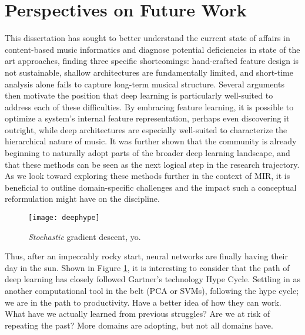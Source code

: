 \section{Perspectives on Future Work}
\label{sec:future}




This dissertation has sought to better understand the current state of affairs in content-based music informatics and diagnose potential deficiencies in state of the art approaches, finding three specific shortcomings: hand-crafted feature design is not sustainable, shallow architectures are fundamentally limited, and short-time analysis alone fails to capture long-term musical structure.
Several arguments then motivate the position that deep learning is particularly well-suited to address each of these difficulties.
By embracing feature learning, it is possible to optimize a system's internal feature representation, perhaps even discovering it outright, while deep architectures are especially well-suited to characterize the hierarchical nature of music.
It was further shown that the community is already beginning to naturally adopt parts of the broader deep learning landscape, and that these methods can be seen as the next logical step in the research trajectory.
As we look toward exploring these methods further in the context of MIR, it is beneficial to outline domain-specific challenges and the impact such a conceptual reformulation might have on the discipline.

\begin{figure}
\begin{centering}
\texttt{[image: deephype]}
\caption{\emph{Stochastic} gradient descent, yo.}
\label{fig:deephype}
\end{centering}
\end{figure}

Thus, after an impeccably rocky start, neural networks are finally having their day in the sun.
Shown in Figure \ref{fig:deephype}, it is interesting to consider that the path of deep learning has closely followed Gartner's technology Hype Cycle.
Settling in as another computational tool in the belt (PCA or SVMs), following the hype cycle; we are in the path to productivity.
Have a better idea of how they can work.
What have we actually learned from previous struggles? Are we at risk of repeating the past?
More domains are adopting, but not all domains have.

